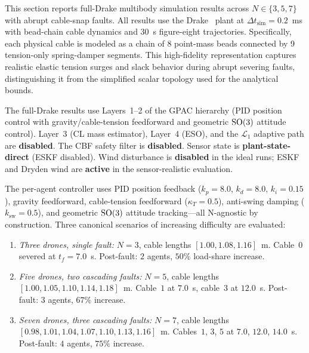 This section reports full-Drake multibody simulation results across $N \in \{3, 5, 7\}$ with abrupt cable-snap faults. All results use the Drake~\cite{drake2024} plant at $\Delta t_{\mathrm{sim}} = 0.2$~ms with bead-chain cable dynamics and $30$~s figure-eight trajectories. Specifically, each physical cable is modeled as a chain of 8 point-mass beads connected by 9 tension-only spring-damper segments. This high-fidelity representation captures realistic elastic tension surges and slack behavior during abrupt severing faults, distinguishing it from the simplified scalar topology used for the analytical bounds.

\begin{remark}\label{rem:system_under_test}
The full-Drake results use Layers~1--2 of the GPAC hierarchy (PID position control with gravity/cable-tension feedforward and geometric $\mathrm{SO}(3)$ attitude control). Layer~3 (CL mass estimator), Layer~4 (ESO), and the $\mathcal{L}_1$ adaptive path are \textbf{disabled}. The CBF safety filter is \textbf{disabled}. Sensor state is \textbf{plant-state-direct} (ESKF disabled). Wind disturbance is \textbf{disabled} in the ideal runs; ESKF and Dryden wind are \textbf{active} in the sensor-realistic evaluation.
\end{remark}

The per-agent controller uses PID position feedback ($k_p = 8.0$, $k_d = 8.0$, $k_i = 0.15$), gravity feedforward, cable-tension feedforward ($\kappa_T = 0.5$), anti-swing damping ($k_{\mathrm{sw}} = 0.5$), and geometric $\mathrm{SO}(3)$ attitude tracking---all N-agnostic by construction. Three canonical scenarios of increasing difficulty are evaluated:

\begin{enumerate}[label=(\roman*),nosep]
  \item \emph{Three drones, single fault:} $N = 3$, cable lengths $[1.00, 1.08, 1.16]$~m. Cable~$0$ severed at $t_f = 7.0$~s. Post-fault: $2$ agents, $50\%$ load-share increase.
  \item \emph{Five drones, two cascading faults:} $N = 5$, cable lengths $[1.00, 1.05, 1.10, 1.14, 1.18]$~m. Cable~$1$ at $7.0$~s, cable~$3$ at $12.0$~s. Post-fault: $3$ agents, $67\%$ increase.
  \item \emph{Seven drones, three cascading faults:} $N = 7$, cable lengths $[0.98, 1.01, 1.04, 1.07, 1.10, 1.13, 1.16]$~m. Cables~$1$, $3$, $5$ at $7.0$, $12.0$, $14.0$~s. Post-fault: $4$ agents, $75\%$ increase.
\end{enumerate}

